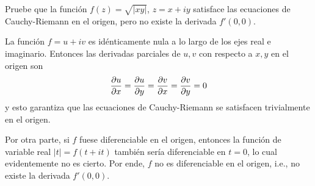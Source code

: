 \begin{exercise}
Pruebe que la función $f(z) = \sqrt {|xy|}$, $z = x + iy$ satisface las ecuaciones de Cauchy-Riemann en el origen, pero no existe la derivada $f'(0,0)$.
\end{exercise}

\begin{solution}
La función $f = u + iv$ es idénticamente nula a lo largo de los ejes real e imaginario. Entonces las derivadas parciales de $u, v$ con respecto a $x, y$ en el origen son
$$\dfrac {\partial u} {\partial x} = \dfrac {\partial u} {\partial y} = \dfrac {\partial v} {\partial x} = \dfrac {\partial v} {\partial y} = 0$$
y esto garantiza que las ecuaciones de Cauchy-Riemann se satisfacen trivialmente en el origen.

Por otra parte, si $f$ fuese diferenciable en el origen, entonces la función de variable real $|t| = f(t+it)$ también sería diferenciable en $t = 0$, lo cual evidentemente no es cierto. Por ende, $f$ no es diferenciable en el origen, i.e., no existe la derivada $f'(0,0)$.
\end{solution}

